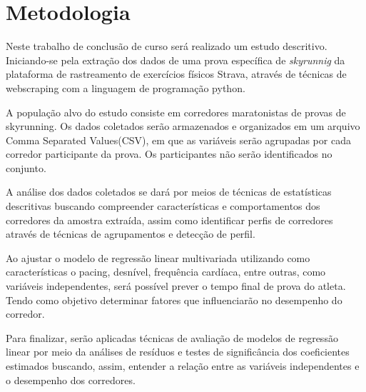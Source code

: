 \section{Metodologia}

 Neste trabalho de conclusão de curso será realizado um estudo descritivo. Iniciando-se pela extração dos dados de uma prova específica de \textit{skyrunnig} da plataforma de rastreamento de exercícios físicos Strava, através de técnicas de webscraping com a linguagem de programação python. 
 
 A população alvo do estudo consiste em corredores maratonistas de provas de skyrunning. Os dados coletados serão armazenados e organizados em um arquivo Comma Separated Values(CSV), em que as variáveis serão agrupadas por cada corredor participante da prova. Os participantes não serão identificados no conjunto. 

 A análise dos dados coletados se dará por meios de técnicas de estatísticas descritivas buscando compreender características e comportamentos dos corredores da amostra extraída, assim como identificar perfis de corredores através de técnicas de agrupamentos e detecção de perfil. 
 
 Ao ajustar o modelo de regressão linear multivariada utilizando como características o pacing, desnível, frequência cardíaca, entre outras, como variáveis independentes, será possível prever o tempo final de prova do atleta. Tendo como objetivo determinar fatores que influenciarão no desempenho do corredor.

 Para finalizar, serão aplicadas técnicas de avaliação de modelos de regressão linear por meio da análises de resíduos e testes de significância dos coeficientes estimados buscando, assim, entender a relação entre as variáveis independentes e o desempenho dos corredores.


 


 
 
 

